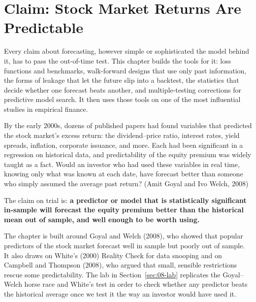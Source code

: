 \chapter{Claim: Stock Market Returns Are Predictable}
\label{ch:08}

Every claim about forecasting, however simple or sophisticated the model behind it, has to pass the out-of-time test. This chapter builds the tools for it: loss functions and benchmarks, walk-forward designs that use only past information, the forms of leakage that let the future slip into a backtest, the statistics that decide whether one forecast beats another, and multiple-testing corrections for predictive model search. It then uses those tools on one of the most influential studies in empirical finance.

By the early 2000s, dozens of published papers had found variables that predicted the stock market's excess return: the dividend--price ratio, interest rates, yield spreads, inflation, corporate issuance, and more. Each had been significant in a regression on historical data, and predictability of the equity premium was widely taught as a fact. Would an investor who had used these variables in real time, knowing only what was known at each date, have forecast better than someone who simply assumed the average past return? (Amit Goyal and Ivo Welch, 2008)

The claim on trial is: \textbf{a predictor or model that is statistically significant in-sample will forecast the equity premium better than the historical mean out of sample, and well enough to be worth using.}

The chapter is built around Goyal and Welch (2008), who showed that popular predictors of the stock market forecast well in sample but poorly out of sample. It also draws on White's (2000) Reality Check for data snooping and on Campbell and Thompson (2008), who argued that small, sensible restrictions rescue some predictability. The lab in Section~\ref{sec:08-lab} replicates the Goyal--Welch horse race and White's test in order to check whether any predictor beats the historical average once we test it the way an investor would have used it.

